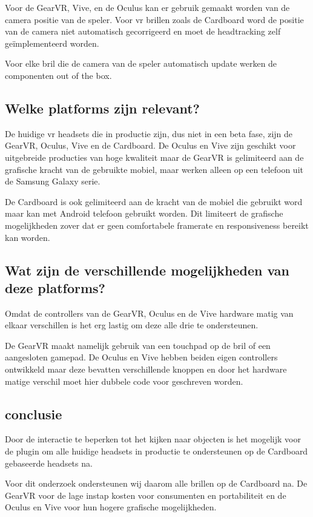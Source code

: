 Voor de GearVR, Vive, en de Oculus kan er gebruik gemaakt worden van de camera positie van de speler. Voor \gls{vr} brillen zoals de Cardboard word de positie van de camera niet automatisch gecorrigeerd en moet de headtracking zelf geïmplementeerd worden. 

Voor elke bril die de camera van de speler automatisch update werken de componenten out of the box.

\subsection{Welke platforms zijn relevant?}
De huidige \gls{vr} headsets die in productie zijn, dus niet in een beta fase, zijn de GearVR, Oculus, Vive en de Cardboard. De Oculus en Vive zijn geschikt voor uitgebreide producties van hoge kwaliteit maar de GearVR is gelimiteerd aan de grafische kracht van de gebruikte mobiel, maar werken alleen op een telefoon uit de Samsung Galaxy serie. 

De Cardboard is ook gelimiteerd aan de kracht van de mobiel die gebruikt word maar kan met Android telefoon gebruikt worden. Dit limiteert de grafische mogelijkheden zover dat er geen comfortabele framerate en responsiveness bereikt kan worden.

\subsection{Wat zijn de verschillende mogelijkheden van deze platforms?}
Omdat de controllers van de GearVR, Oculus en de Vive hardware matig van elkaar verschillen is het erg lastig om deze alle drie te ondersteunen. 

De GearVR maakt namelijk gebruik van een touchpad op de bril of een aangesloten gamepad. De Oculus en Vive hebben beiden eigen controllers ontwikkeld maar deze bevatten verschillende knoppen en door het hardware matige verschil moet hier dubbele code voor geschreven worden.

\subsection{conclusie}
Door de interactie te beperken tot het kijken naar objecten is het mogelijk voor de plugin om alle huidige headsets in productie te ondersteunen op de Cardboard gebaseerde headsets na.

Voor dit onderzoek ondersteunen wij daarom alle brillen op de Cardboard na. De GearVR voor de lage instap kosten voor consumenten en portabiliteit en de Oculus en Vive voor hun hogere grafische mogelijkheden.